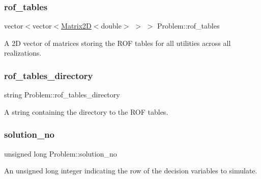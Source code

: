\subsubsection{\texorpdfstring{rof\+\_\+tables}{rof\_tables}}
{\footnotesize\ttfamily vector$<$vector$<$\mbox{\hyperlink{classMatrix2D}{Matrix2D}}$<$double$>$ $>$ $>$ Problem\+::rof\+\_\+tables\hspace{0.3cm}{\ttfamily [protected]}}



A 2D vector of matrices storing the R\+OF tables for all utilities across all realizations. 

\mbox{\label{classProblem_abc641b49a4defb0dbabafbf3f9dbca6e}} 
\subsubsection{\texorpdfstring{rof\+\_\+tables\+\_\+directory}{rof\_tables\_directory}}
{\footnotesize\ttfamily string Problem\+::rof\+\_\+tables\+\_\+directory\hspace{0.3cm}{\ttfamily [protected]}}



A string containing the directory to the R\+OF tables. 

\mbox{\label{classProblem_a7ca15cdcbff926ddca25bdee5984ffe5}} 
\subsubsection{\texorpdfstring{solution\+\_\+no}{solution\_no}}
{\footnotesize\ttfamily unsigned long Problem\+::solution\+\_\+no\hspace{0.3cm}{\ttfamily [protected]}}



An unsigned long integer indicating the row of the decision variables to simulate. 

\mbox{\label{classProblem_a27cae146b3409021f6d5936404cd1083}} 
